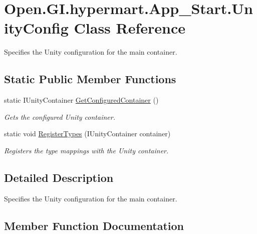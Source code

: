 \hypertarget{class_open_1_1_g_i_1_1hypermart_1_1_app___start_1_1_unity_config}{}\section{Open.\+G\+I.\+hypermart.\+App\+\_\+\+Start.\+Unity\+Config Class Reference}
\label{class_open_1_1_g_i_1_1hypermart_1_1_app___start_1_1_unity_config}


Specifies the Unity configuration for the main container.  


\subsection*{Static Public Member Functions}
\begin{DoxyCompactItemize}
\item 
static I\+Unity\+Container \hyperlink{class_open_1_1_g_i_1_1hypermart_1_1_app___start_1_1_unity_config_a5ef8083dd9a90a437da3fc2ddcc11ce3}{Get\+Configured\+Container} ()
\begin{DoxyCompactList}\small\item\em Gets the configured Unity container. \end{DoxyCompactList}\item 
static void \hyperlink{class_open_1_1_g_i_1_1hypermart_1_1_app___start_1_1_unity_config_abba412f0f6c67fdd94a735c3b09cc03e}{Register\+Types} (I\+Unity\+Container container)
\begin{DoxyCompactList}\small\item\em Registers the type mappings with the Unity container.\end{DoxyCompactList}\end{DoxyCompactItemize}


\subsection{Detailed Description}
Specifies the Unity configuration for the main container. 



\subsection{Member Function Documentation}
\hypertarget{class_open_1_1_g_i_1_1hypermart_1_1_app___start_1_1_unity_config_a5ef8083dd9a90a437da3fc2ddcc11ce3}{}\label{class_open_1_1_g_i_1_1hypermart_1_1_app___start_1_1_unity_config_a5ef8083dd9a90a437da3fc2ddcc11ce3} 
